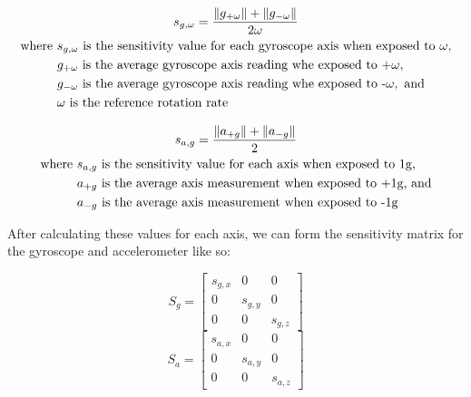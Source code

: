 \begin{gather} \label{eq:gyroscope_sensitivity}
    s_{g, \omega} = \frac{\lVert g_{+\omega}\rVert + \lVert g_{-\omega}\rVert}{2\omega} \\
    \begin{aligned}
        \text{where } & s_{g,\omega} \text{ is the sensitivity value for each gyroscope axis when exposed to } \omega , \\
        & g_{+\omega } \text{ is the average gyroscope axis reading whe exposed to +} \omega ,\\
        & g_{-\omega } \text{ is the average gyroscope axis reading whe exposed to -} \omega , \text{ and} \\
        & \omega \text{ is the reference rotation rate}
    \end{aligned} \notag
\end{gather}

\begin{gather} \label{eq:accelerometer_sensitivity}
    s_{a, g} = \frac{\lVert a_{+g} \rVert + \lVert a_{-g} \rVert}{2} \\
    \begin{aligned}
        \text{where } & s_{a,g} \text{ is the sensitivity value for each axis when exposed to 1g,} \\
        & a_{+g} \text{ is the average axis measurement when exposed to +1g, and} \\
        & a_{-g} \text{ is the average axis measurement when exposed to -1g}
    \end{aligned} \notag
\end{gather}

After calculating these values for each axis, we can form the sensitivity matrix for the gyroscope and accelerometer like so:

\begin{equation}
    S_g = 
    \begin{bmatrix}
        s_{g,x} & 0 & 0 \\
        0 & s_{g,y} & 0 \\
        0 & 0 & s_{g,z}
    \end{bmatrix} 
\end{equation}
\begin{equation}
    S_a =
    \begin{bmatrix}
        s_{a,x} & 0 & 0 \\
        0 & s_{a,y} & 0 \\
        0 & 0 & s_{a,z}
    \end{bmatrix}
\end{equation}

